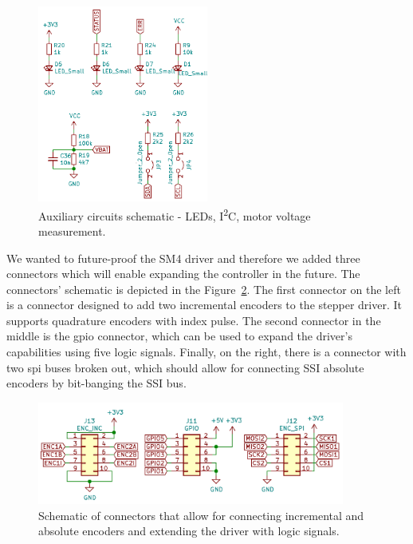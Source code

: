 \begin{figure}[H]
    \centering
    \includegraphics[width=0.5\textwidth]{obrazky/schem_aux}
    \caption{Auxiliary circuits schematic - LEDs, I\textsuperscript{2}C, motor voltage measurement.}
    \label{fig:schem_aux}
\end{figure}

We wanted to future-proof the SM4 driver and therefore we added three connectors which will enable expanding the controller in the future.
The connectors' schematic is depicted in the Figure~\ref{fig:schem_enc_gpio}.
The first connector on the left is a connector designed to add two incremental encoders to the stepper driver.
It supports quadrature encoders with index pulse.
The second connector in the middle is the \acs{gpio} connector, which can be used to expand the driver's capabilities using five logic signals.
Finally, on the right, there is a connector with two \acs{spi} buses broken out, which should allow for connecting SSI absolute encoders by bit-banging the SSI bus.

\begin{figure}[H]
    \centering
    \includegraphics[width=0.9\textwidth]{obrazky/schem_enc_gpio}
    \caption{Schematic of connectors that allow for connecting incremental and absolute encoders and extending the driver with logic signals.}
    \label{fig:schem_enc_gpio}
\end{figure}

